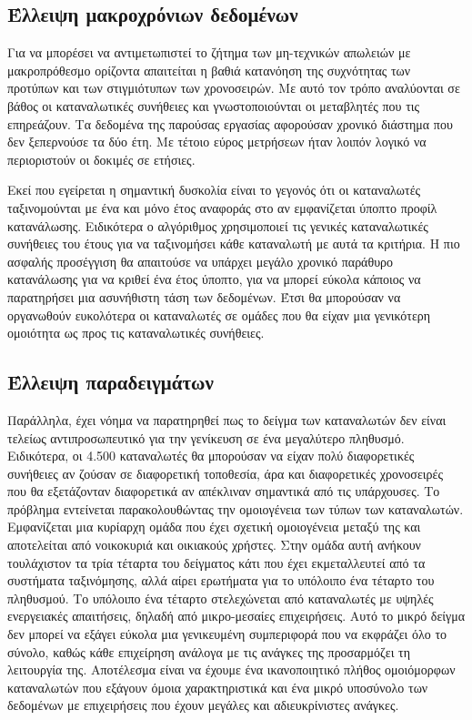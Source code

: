 \subsection{Έλλειψη μακροχρόνιων δεδομένων}
Για να μπορέσει να αντιμετωπιστεί το ζήτημα των μη-τεχνικών απωλειών με μακροπρόθεσμο ορίζοντα απαιτείται η βαθιά κατανόηση της συχνότητας των προτύπων και των στιγμιότυπων των χρονοσειρών. Με αυτό τον τρόπο αναλύονται σε βάθος οι καταναλωτικές συνήθειες και γνωστοποιούνται οι μεταβλητές που τις επηρεάζουν. Τα δεδομένα της παρούσας εργασίας αφορούσαν χρονικό διάστημα που δεν ξεπερνούσε τα δύο έτη. Με τέτοιο εύρος μετρήσεων ήταν λοιπόν λογικό να περιοριστούν οι δοκιμές σε ετήσιες.\par
Εκεί που εγείρεται η σημαντική δυσκολία είναι το γεγονός ότι οι καταναλωτές ταξινομούνται με ένα και μόνο έτος αναφοράς στο αν εμφανίζεται ύποπτο προφίλ κατανάλωσης. Ειδικότερα ο αλγόριθμος χρησιμοποιεί τις γενικές καταναλωτικές συνήθειες του έτους για να ταξινομήσει κάθε καταναλωτή με αυτά τα κριτήρια. Η πιο ασφαλής προσέγγιση θα απαιτούσε να υπάρχει μεγάλο χρονικό παράθυρο κατανάλωσης για να κριθεί ένα έτος ύποπτο, για να μπορεί εύκολα κάποιος να παρατηρήσει μια ασυνήθιστη τάση των δεδομένων. Έτσι θα μπορούσαν να οργανωθούν ευκολότερα οι καταναλωτές σε ομάδες που θα είχαν μια γενικότερη ομοιότητα ως προς τις καταναλωτικές συνήθειες.
\subsection{Έλλειψη παραδειγμάτων}
Παράλληλα, έχει νόημα να παρατηρηθεί πως το δείγμα των καταναλωτών δεν είναι τελείως αντιπροσωπευτικό για την γενίκευση σε ένα μεγαλύτερο πληθυσμό. Ειδικότερα, οι 4.500 καταναλωτές θα μπορούσαν να είχαν πολύ διαφορετικές συνήθειες αν ζούσαν σε διαφορετική τοποθεσία, άρα και διαφορετικές χρονοσειρές που θα εξετάζονταν διαφορετικά αν απέκλιναν σημαντικά από τις υπάρχουσες. Το πρόβλημα εντείνεται παρακολουθώντας την ομοιογένεια των τύπων των καταναλωτών. Εμφανίζεται μια κυρίαρχη ομάδα που έχει σχετική ομοιογένεια μεταξύ της και αποτελείται από νοικοκυριά και οικιακούς χρήστες. Στην ομάδα αυτή ανήκουν τουλάχιστον τα τρία τέταρτα του δείγματος κάτι που έχει εκμεταλλευτεί από τα συστήματα ταξινόμησης, αλλά αίρει ερωτήματα για το υπόλοιπο ένα τέταρτο του πληθυσμού. Το υπόλοιπο ένα τέταρτο στελεχώνεται από καταναλωτές με υψηλές ενεργειακές απαιτήσεις, δηλαδή από μικρο-μεσαίες επιχειρήσεις. Αυτό το μικρό δείγμα δεν μπορεί να εξάγει εύκολα μια γενικευμένη συμπεριφορά που να εκφράζει όλο το σύνολο, καθώς κάθε επιχείρηση ανάλογα με τις ανάγκες της προσαρμόζει τη λειτουργία της. Αποτέλεσμα είναι να έχουμε ένα ικανοποιητικό πλήθος ομοιόμορφων καταναλωτών που εξάγουν όμοια χαρακτηριστικά και ένα μικρό υποσύνολο των δεδομένων με επιχειρήσεις που έχουν μεγάλες και αδιευκρίνιστες ανάγκες.
